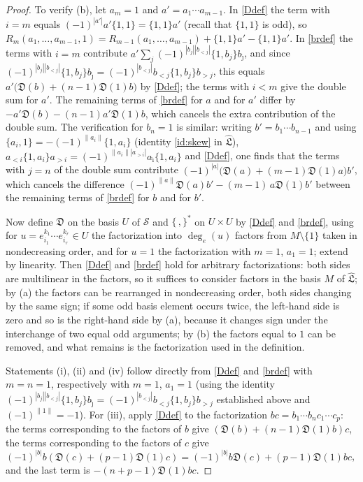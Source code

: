 \documentclass[11pt,reqno]{amsart}
\newcommand{\LL}{\mathfrak L}
\newcommand{\D}{\mathfrak D}
\newcommand{\Sm}{\mathcal S}
\newcommand{\Lh}{\widehat{\LL}}
\newcommand{\rp}[1]{\|#1\|}
\theoremstyle{plain}
\theoremstyle{definition}
\theoremstyle{remark}
\begin{document}
\begin{proof}
To verify (b), let $a_m=1$ and $a'=a_1\cdots a_{m-1}$.
In \eqref{Ddef} the term with $i=m$ equals $(-1)^{|a'|}a'\{1,1\}=\{1,1\}a'$ (recall that $\{1,1\}$ is odd), so $R_m(a_1,\dots,a_{m-1},1)=R_{m-1}(a_1,\dots,a_{m-1})+\{1,1\}a'-\{1,1\}a'$.
In \eqref{brdef} the terms with $i=m$ contribute $a'\sum_{j}(-1)^{|b_j||b_{<j}|}\{1,b_j\}b_{\hat\jmath}$, and since $(-1)^{|b_j||b_{<j}|}\{1,b_j\}b_{\hat\jmath}=(-1)^{|b_{<j}|}b_{<j}\{1,b_j\}b_{>j}$, this equals $a'\bigl(\D(b)+(n-1)\D(1)b\bigr)$ by \eqref{Ddef}; the terms with $i<m$ give the double sum for $a'$.
The remaining terms of \eqref{brdef} for $a$ and for $a'$ differ by $-a'\D(b)-(n-1)a'\D(1)b$, which cancels the extra contribution of the double sum.
The verification for $b_n=1$ is similar: writing $b'=b_1\cdots b_{n-1}$ and using $\{a_i,1\}=-(-1)^{\rp{a_i}}\{1,a_i\}$ (identity \eqref{id:skew} in $\Lh$), $a_{<i}\{1,a_i\}a_{>i}=(-1)^{\rp{a_i}|a_{>i}|}a_{\hat\imath}\{1,a_i\}$ and \eqref{Ddef}, one finds that the terms with $j=n$ of the double sum contribute $(-1)^{|a|}\bigl(\D(a)+(m-1)\D(1)a\bigr)b'$, which cancels the difference $(-1)^{\rp a}\D(a)b'-(m-1)\,a\D(1)b'$ between the remaining terms of \eqref{brdef} for $b$ and for $b'$.

Now define $\D$ on the basis $U$ of $\Sm$ and $\{\,,\}^*$ on $U\times U$ by \eqref{Ddef} and \eqref{brdef}, using for $u=e_{i_1}^{k_1}\cdots e_{i_r}^{k_r}\in U$ the factorization into $\deg_e(u)$ factors from $M\setminus\{1\}$ taken in nondecreasing order, and for $u=1$ the factorization with $m=1$, $a_1=1$; extend by linearity.
Then \eqref{Ddef} and \eqref{brdef} hold for arbitrary factorizations: both sides are multilinear in the factors, so it suffices to consider factors in the basis $M$ of $\Lh$; by (a) the factors can be rearranged in nondecreasing order, both sides changing by the same sign; if some odd basis element occurs twice, the left-hand side is zero and so is the right-hand side by (a), because it changes sign under the interchange of two equal odd arguments; by (b) the factors equal to $1$ can be removed, and what remains is the factorization used in the definition.

Statements (i), (ii) and (iv) follow directly from \eqref{Ddef} and \eqref{brdef} with $m=n=1$, respectively with $m=1$, $a_1=1$ (using the identity $(-1)^{|b_j||b_{<j}|}\{1,b_j\}b_{\hat\jmath}=(-1)^{|b_{<j}|}b_{<j}\{1,b_j\}b_{>j}$ established above and $(-1)^{\rp 1}=-1$).
For (iii), apply \eqref{Ddef} to the factorization $bc=b_1\cdots b_nc_1\cdots c_p$: the terms corresponding to the factors of $b$ give $(\D(b)+(n-1)\D(1)b)c$, the terms corresponding to the factors of $c$ give $(-1)^{|b|}b(\D(c)+(p-1)\D(1)c)=(-1)^{|b|}b\D(c)+(p-1)\D(1)bc$, and the last term is $-(n+p-1)\D(1)bc$.
\end{proof}
\end{document}
